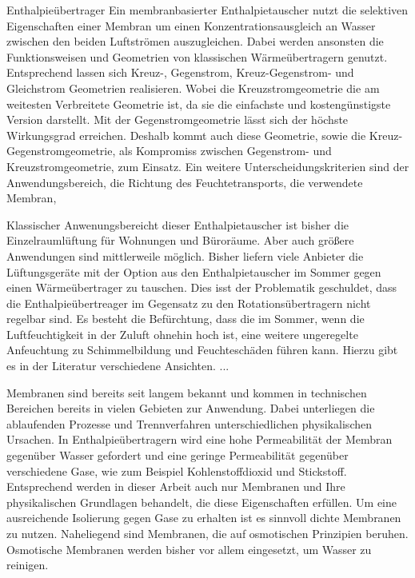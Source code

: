 \begin{normalsize}
\begin{LARGE}
Enthalpieübertrager
Ein membranbasierter Enthalpietauscher nutzt die selektiven Eigenschaften einer Membran um einen Konzentrationsausgleich an Wasser zwischen den beiden Luftströmen auszugleichen. Dabei werden ansonsten die Funktionsweisen und Geometrien von klassischen Wärmeübertragern genutzt. Entsprechend lassen sich Kreuz-, Gegenstrom, Kreuz-Gegenstrom- und Gleichstrom Geometrien realisieren. Wobei die Kreuzstromgeometrie die am weitesten Verbreitete Geometrie ist, da sie die einfachste und kostengünstigste Version darstellt. Mit der Gegenstromgeometrie lässt sich der höchste Wirkungsgrad erreichen. Deshalb kommt auch diese Geometrie, sowie die Kreuz-Gegenstromgeometrie, als Kompromiss zwischen Gegenstrom- und Kreuzstromgeometrie, zum Einsatz. 
Ein weitere Unterscheidungskriterien sind der Anwendungsbereich, die Richtung des Feuchtetransports, die verwendete Membran,

Klassischer Anwenungsbereicht dieser Enthalpietauscher ist bisher die Einzelraumlüftung für Wohnungen und Büroräume. Aber auch größere Anwendungen sind mittlerweile möglich. Bisher liefern viele Anbieter die Lüftungsgeräte mit der Option aus den Enthalpietauscher im Sommer gegen einen Wärmeübertrager zu tauschen. Dies isst der Problematik geschuldet, dass die Enthalpieübertreager im Gegensatz zu den Rotationsübertragern nicht regelbar sind. Es besteht die Befürchtung, dass die im Sommer, wenn die Luftfeuchtigkeit in der Zuluft ohnehin hoch ist, eine weitere ungeregelte Anfeuchtung zu Schimmelbildung und Feuchteschäden führen kann. Hierzu gibt es in der Literatur verschiedene Ansichten. ...









Membranen sind bereits seit langem bekannt und kommen in technischen Bereichen bereits in vielen Gebieten zur Anwendung. Dabei unterliegen die ablaufenden Prozesse und Trennverfahren unterschiedlichen physikalischen Ursachen. In Enthalpieübertragern wird eine hohe Permeabilität der Membran gegenüber Wasser gefordert und eine geringe Permeabilität gegenüber verschiedene Gase, wie zum Beispiel Kohlenstoffdioxid und Stickstoff. Entsprechend werden in dieser Arbeit auch nur Membranen und Ihre physikalischen Grundlagen behandelt, die diese Eigenschaften erfüllen. Um eine ausreichende Isolierung gegen Gase zu erhalten ist es sinnvoll dichte Membranen zu nutzen. Naheliegend sind Membranen, die auf osmotischen Prinzipien beruhen. Osmotische Membranen werden bisher vor allem eingesetzt, um Wasser zu reinigen. 

 
\end{LARGE}
\end{normalsize}


